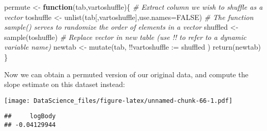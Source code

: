 \documentclass[
]{book}
\newenvironment{Shaded}{\begin{snugshade}}{\end{snugshade}}
\newcommand{\AttributeTok}[1]{\textcolor[rgb]{0.77,0.63,0.00}{#1}}
\newcommand{\CommentTok}[1]{\textcolor[rgb]{0.56,0.35,0.01}{\textit{#1}}}
\newcommand{\ConstantTok}[1]{\textcolor[rgb]{0.00,0.00,0.00}{#1}}
\newcommand{\ControlFlowTok}[1]{\textcolor[rgb]{0.13,0.29,0.53}{\textbf{#1}}}
\newcommand{\DecValTok}[1]{\textcolor[rgb]{0.00,0.00,0.81}{#1}}
\newcommand{\FunctionTok}[1]{\textcolor[rgb]{0.00,0.00,0.00}{#1}}
\newcommand{\NormalTok}[1]{#1}
\newcommand{\OtherTok}[1]{\textcolor[rgb]{0.56,0.35,0.01}{#1}}
\newcommand{\SpecialCharTok}[1]{\textcolor[rgb]{0.00,0.00,0.00}{#1}}
\newcommand{\StringTok}[1]{\textcolor[rgb]{0.31,0.60,0.02}{#1}}
\begin{document}
\begin{Shaded}
\begin{Highlighting}[]
\NormalTok{permute }\OtherTok{\textless{}{-}} \ControlFlowTok{function}\NormalTok{(tab,vartoshuffle)\{}
  \CommentTok{\# Extract column we wish to shuffle as a vector}
\NormalTok{  toshuffle }\OtherTok{\textless{}{-}} \FunctionTok{unlist}\NormalTok{(tab[,vartoshuffle],}\AttributeTok{use.names=}\ConstantTok{FALSE}\NormalTok{)}
  \CommentTok{\# The function sample() serves to randomize the order of elements in a vector}
\NormalTok{  shuffled }\OtherTok{\textless{}{-}} \FunctionTok{sample}\NormalTok{(toshuffle)}
  \CommentTok{\# Replace vector in new table (use !! to refer to a dynamic variable name)}
\NormalTok{  newtab }\OtherTok{\textless{}{-}} \FunctionTok{mutate}\NormalTok{(tab, }\SpecialCharTok{!!}\AttributeTok{vartoshuffle :=}\NormalTok{ shuffled )}
  \FunctionTok{return}\NormalTok{(newtab)}
\NormalTok{\}}
\end{Highlighting}
\end{Shaded}

Now we can obtain a permuted version of our original data, and compute the slope estimate on this dataset instead:

\begin{Shaded}
\end{Shaded}

\texttt{[image: DataScience\_files/figure-latex/unnamed-chunk-66-1.pdf]}

\begin{Shaded}
\end{Shaded}

\begin{verbatim}
##     logBody 
## -0.04129944
\end{verbatim}
\end{document}
